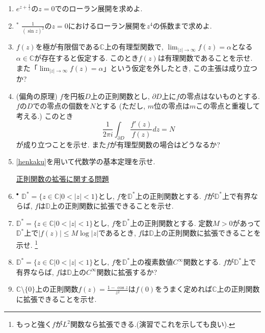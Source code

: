 \documentclass[dvipdfmx,a4paper,11pt]{article}
\newcommand{\C}{\mathbb{C}}
\newcommand{\D}{\mathbb{D}}
\theoremstyle{definition}
\begin{document}
\begin{enumerate}[label=\textbf{問}4.\arabic*]
\item $e^{z + \frac{1}{z}}$の$z=0$でのローラン展開を求めよ.


\item  $^{*}$ $\frac{1}{(\sin z)^2}$の$z=0$におけるローラン展開を$z^4$の係数まで求めよ.

 \item $f(z)$を極が有限個である$\C$上の有理型関数で, $\lim_{|z| \rightarrow \infty} f(z)= \alpha $となる$\alpha \in \C$が存在すると仮定する. このとき$f(z)$は有理関数であることを示せ.
   また「$\lim_{|z| \rightarrow \infty} f(z)= \alpha $」という仮定を外したとき, この主張は成り立つか?
       
  \item \label{henkaku} (偏角の原理) $f$を円板$D$上の正則関数とし, $\partial D$上に$f$の零点はないものとする. 
  $f$の$D$での零点の個数を$N$とする (ただし, $m$位の零点は$m$この零点と重複して考える.)
  このとき
  $$
  \frac{1}{2 \pi i} \int_{\partial D} \frac{f' (z)}{f(z)} dz = N
  $$
  が成り立つことを示せ. また$f$が有理型関数の場合はどうなるか?
  \item \ref{henkaku}を用いて代数学の基本定理を示せ.
  
\vspace{12pt}
\hspace{-36pt}\underline{正則関数の拡張に関する問題}



 \item \label{yukai} $^{\bullet}$  $\D^{*}=\{z \in \C | 0 < |z| <1\}$とし, $f$を$\D^{*}$上の正則関数とする. 
 $f$が$\D^{*}$上で有界ならば, $f$は$\D$上の正則関数に拡張できることを示せ. 
 
  \item $\D^{*}=\{z \in \C | 0 < |z| <1\}$とし, 
  $f$を$\D^{*}$上の正則関数とする. %
 定数$M>0$があって$\D^{*}$上で$|f(z)| \le M \log |z|$であるとき, $f$は$\D$上の正則関数に拡張できることを示せ. \footnote{もっと強く$f$が$L^2$関数なら拡張できる.(演習でこれを示しても良い).}
 
 
 \item $\D^{*}=\{z \in \C | 0 < |z| <1\}$とし, $f$を$\D^{*}$上の複素数値$C^{\infty}$関数とする. 
 $f$が$\D^{*}$上で有界ならば, $f$は$\D$上の$C^{\infty}$関数に拡張するか?
 
  \item $\C \setminus \{ 0\}$上の正則関数$f(z)=\frac{1 - \cos z}{z^2}$は$f(0)$をうまく定めれば$\C$上の正則関数に拡張できることを示せ. 
  

\end{enumerate}
\end{document}
